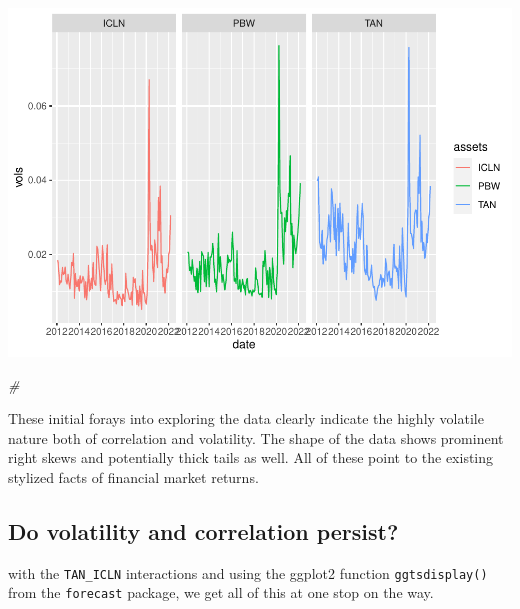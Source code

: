 \documentclass{article}
\newenvironment{Shaded}{\begin{snugshade}}{\end{snugshade}}
\newcommand{\AttributeTok}[1]{\textcolor[rgb]{0.77,0.63,0.00}{#1}}
\newcommand{\CommentTok}[1]{\textcolor[rgb]{0.56,0.35,0.01}{\textit{#1}}}
\newcommand{\DecValTok}[1]{\textcolor[rgb]{0.00,0.00,0.81}{#1}}
\newcommand{\FunctionTok}[1]{\textcolor[rgb]{0.00,0.00,0.00}{#1}}
\newcommand{\NormalTok}[1]{#1}
\newcommand{\OtherTok}[1]{\textcolor[rgb]{0.56,0.35,0.01}{#1}}
\newcommand{\SpecialCharTok}[1]{\textcolor[rgb]{0.00,0.00,0.00}{#1}}
\newcommand{\StringTok}[1]{\textcolor[rgb]{0.31,0.60,0.02}{#1}}
\begin{document}
\includegraphics{market-facts_files/figure-latex/vols-ex-2.pdf}

\begin{Shaded}
\begin{Highlighting}[]
\CommentTok{\#}
\end{Highlighting}
\end{Shaded}

These initial forays into exploring the data clearly indicate the highly
volatile nature both of correlation and volatility. The shape of the
data shows prominent right skews and potentially thick tails as well.
All of these point to the existing stylized facts of financial market
returns.

\hypertarget{do-volatility-and-correlation-persist}{%
\subsection{Do volatility and correlation
persist?}\label{do-volatility-and-correlation-persist}}

with the \texttt{TAN\_ICLN} interactions and using the ggplot2 function
\texttt{ggtsdisplay()} from the \texttt{forecast} package, we get all of
this at one stop on the way.

\begin{Shaded}
\end{Shaded}
\end{document}
